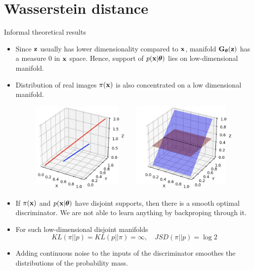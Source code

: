 \section{Wasserstein distance}
\begin{frame}{Informal theoretical results}
	\vspace{-0.3cm}
	\begin{itemize}
		\footnotesize
		\item Since $\mathbf{z}$ usually has lower dimensionality compared to $\mathbf{x}$, manifold $\mathbf{G}_{\boldsymbol{\theta}}(\mathbf{z})$ has a measure 0 in $\mathbf{x}$ space. Hence, support of $p(\mathbf{x} | \boldsymbol{\theta})$ lies on low-dimensional manifold.
		\item Distribution of real images $\pi(\mathbf{x})$ is also concentrated on a low dimensional manifold.
		\begin{figure}
			\centering
			\includegraphics[width=0.5\linewidth]{figs/low_dim_manifold}
		\end{figure}
		\item If $\pi(\mathbf{x})$ and $p(\mathbf{x} | \boldsymbol{\theta})$ have disjoint supports, then there is a smooth optimal discriminator. We are not able to learn anything by backproping through it.
		\item For such low-dimensional disjoint manifolds
		\vspace{-0.2cm}
		\[
			KL(\pi || p) = KL(p || \pi) = \infty, \quad JSD(\pi || p) = \log 2
		\]
		\vspace{-0.7cm}
		\item Adding continuous noise to the inputs of the discriminator smoothes the distributions of the probability mass.
	\end{itemize}
\end{frame}
